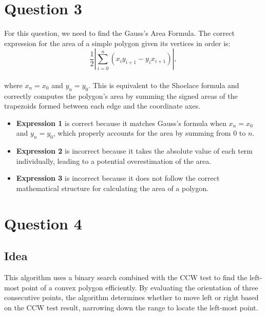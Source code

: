 \documentclass{article}
\begin{document}
\section*{Question 3}
For this question, we need to find the Gauss's Area Formula. The correct expression for the area of a simple polygon given its vertices in order is:
\\
\[ \frac{1}{2} \left| \sum_{i=0}^{n} (x_i y_{i+1} - y_i x_{i+1}) \right|, \]
\\
where \( x_n = x_0 \) and \( y_n = y_0 \). This is equivalent to the Shoelace formula and correctly computes the polygon's area by summing the signed areas of the trapezoids formed between each edge and the coordinate axes.
\\
\begin{itemize}
  \item \textbf{Expression 1} is correct because it matches Gauss's formula when \( x_n = x_0 \) and \( y_n = y_0 \), which properly accounts for the area by summing from 0 to \( n \).
  \item \textbf{Expression 2} is incorrect because it takes the absolute value of each term individually, leading to a potential overestimation of the area.
  \item \textbf{Expression 3} is incorrect because it does not follow the correct mathematical structure for calculating the area of a polygon.
\end{itemize}

\section*{Question 4}

\subsection*{Idea}
This algorithm uses a binary search combined with the CCW test to find the left-most point of a convex polygon efficiently. By evaluating the orientation of three consecutive points, the algorithm determines whether to move left or right based on the CCW test result, narrowing down the range to locate the left-most point.
\end{document}
